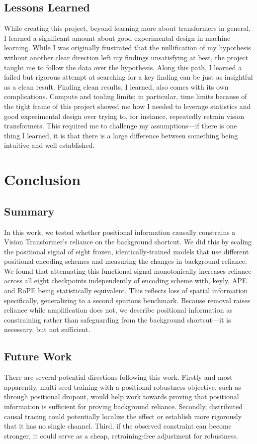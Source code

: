 \documentclass[10pt,twocolumn,letterpaper]{article}
\begin{document}
\subsection{Lessons Learned}
While creating this project, beyond learning more about transformers in general, I learned a significant amount about good experimental design in machine learning. While I was originally frustrated that the nullification of my hypothesis without another clear direction left my findings unsatisfying at best, the project taught me to follow the data over the hypothesis. Along this path, I learned a failed but rigorous attempt at searching for a key finding can be just as insightful as a clean result. Finding clean results, I learned, also comes with its own complications. Compute and tooling limits; in particular, time limits because of the tight frame of this project showed me how I needed to leverage statistics and good experimental design over trying to, for instance, repeatedly retrain vision transformers. This required me to challenge my assumptions---if there is one thing I learned, it is that there is a large difference between something being intuitive and well established.

\section{Conclusion}

\subsection{Summary}
In this work, we tested whether positional information causally constrains a Vision Transformer's reliance on the background shortcut. We did this by scaling the positional signal of eight frozen, identically-trained models that use different positional encoding schemes and measuring the changes in background reliance. We found that attenuating this functional signal monotonically increases reliance across all eight checkpoints independently of encoding scheme with, keyly, APE and RoPE being statistically equivalent. This reflects loss of spatial information specifically, generalizing to a second spurious benchmark. Because removal raises reliance while amplification does not, we describe positional information as constraining rather than safeguarding from the background shortcut---it is necessary, but not sufficient.

\subsection{Future Work}
There are several potential directions following this work. Firstly and most apparently, multi-seed training with a positional-robustness objective, such as through positional dropout, would help work towards proving that positional information is sufficient for proving background reliance. Secondly, distributed causal tracing could potentially localize the effect or establish more rigorously that it has no single channel. Third, if the observed constraint can become stronger, it could serve as a cheap, retraining-free adjustment for robustness.
\end{document}
